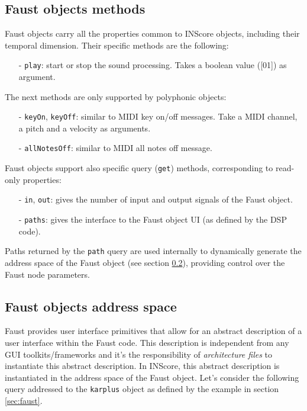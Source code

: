 \documentclass{article}
\newcommand{\ispace}	{\setlength\itemsep{0mm}}
\newcommand{\icode}[1]	{{\small \texttt{#1}}}
\begin{document}
\subsection{Faust objects methods}

Faust objects carry all the properties common to INScore objects, including their temporal dimension. 
Their specific methods are the following:
\begin{itemize}
\item[-] \icode{play}: start or stop the sound processing. Takes a boolean value ([01]) as argument.
\end{itemize}

The next methods are only supported by polyphonic objects:
\begin{itemize}
\ispace
\item[-] \icode{keyOn}, \icode{keyOff}: similar to MIDI key on/off messages. Take a MIDI channel, a pitch and a velocity as arguments.
\item[-] \icode{allNotesOff}: similar to MIDI all notes off message. 
\end{itemize}

Faust objects support also specific query (\icode{get}) methods, corresponding to read-only properties:
\begin{itemize}
\ispace
\item[-] \icode{in}, \icode{out}: gives the number of input and output signals of the Faust object.
\item[-] \icode{paths}: gives the interface to the Faust object UI (as defined by the DSP code).
\end{itemize}

Paths returned by the \icode{path} query are used internally to dynamically generate the address space of the Faust object (see section \ref{faustadrspace}), providing control over the Faust node parameters.

\subsection{Faust objects address space}\label{faustadrspace}

Faust provides user interface primitives that allow for an abstract description of a user interface within the Faust code. This description is independent from any GUI toolkits/frameworks and it's the responsibility of \emph{architecture files} \cite{Fober:11b} to instantiate this abstract description. In INScore, this abstract description is instantiated in the address space of the Faust object.
Let's consider the following query addressed to the \icode{karplus} object as defined by the example in section \ref{sec:faust}.
\end{document}

